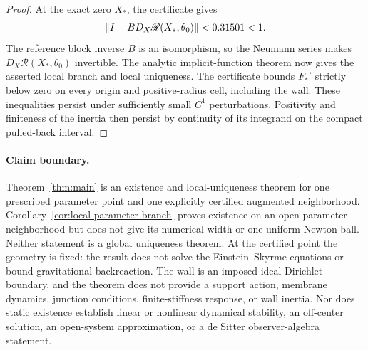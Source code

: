 \begin{proof}
At the exact zero $X_*$, the certificate gives
\[
 \left\lVert I-BD_X\mathscr R(X_*,\theta_0)\right\rVert<0.31501<1.
\]
The reference block inverse $B$ is an isomorphism, so the Neumann series makes
$D_X\mathscr R(X_*,\theta_0)$ invertible.  The analytic implicit-function theorem now
gives the asserted local branch and local uniqueness.  The certificate bounds
$F_*'$ strictly below zero on every origin and positive-radius cell, including
the wall.  These inequalities persist under sufficiently small $C^1$
perturbations.  Positivity and finiteness of the inertia then persist by
continuity of its integrand on the compact pulled-back interval.
\end{proof}

\paragraph{Claim boundary.}
Theorem~\ref{thm:main} is an existence and local-uniqueness theorem for one
prescribed parameter point and one explicitly certified augmented
neighborhood.  Corollary~\ref{cor:local-parameter-branch} proves existence on
an open parameter neighborhood but does not give its numerical width or one
uniform Newton ball.  Neither statement is a global uniqueness theorem.  At
the certified point the geometry is fixed:
the result does not solve the Einstein--Skyrme equations or bound
gravitational backreaction.  The wall is an imposed ideal Dirichlet boundary,
and the theorem does not provide a support action, membrane dynamics, junction
conditions, finite-stiffness response, or wall inertia.  Nor does static existence establish
linear or nonlinear dynamical stability, an off-center solution, an
open-system approximation, or a de Sitter observer-algebra statement.
